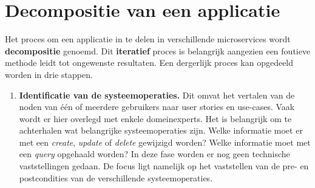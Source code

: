 	
	\chapter{Decompositie van een applicatie}
	Het proces om een applicatie in te delen in verschillende microservices wordt \textbf{decompositie} genoemd. Dit \textbf{iteratief} proces is belangrijk aangezien een foutieve methode leidt tot ongewenste resultaten. Een dergerlijk proces kan opgedeeld worden in drie stappen.
	\begin{enumerate}
		\item[\info]\textbf{Identificatie van de systeemoperaties.} Dit omvat het vertalen van de noden van één of meerdere gebruikers naar user stories en use-cases. Vaak wordt er hier overlegd met enkele domeinexperts. Het is belangrijk om te achterhalen wat belangrijke systeemoperaties zijn. Welke informatie moet er met een \textit{create}, \textit{update} of \textit{delete} gewijzigd worden? Welke informatie moet met een \textit{query} opgehaald worden? In deze fase worden er nog geen technische vaststellingen gedaan. De focus ligt namelijk op het vaststellen van de pre- en postcondities van de verschillende systeemoperaties.
		

\end{enumerate}
